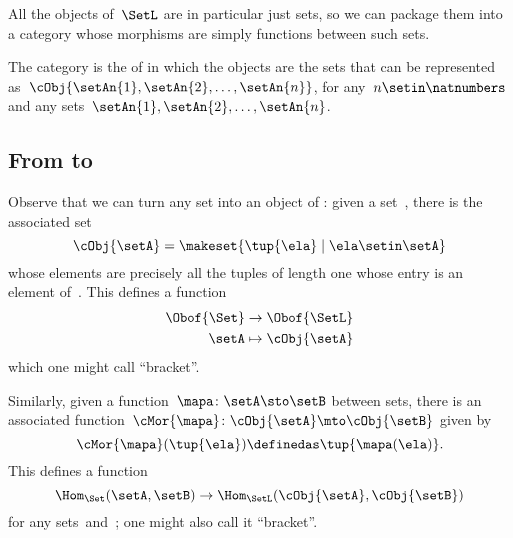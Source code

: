 
All the objects of~$\SetL$ are in particular just sets, so we can package them into a category whose morphisms are simply functions between such sets.

\begin{ctdefinition}[\SetL]\label{def:SetL}
    The category \SetL is the  of \Set in which the objects are the sets that can be represented as~$\cObj{\setAn{1}, \setAn{2}, \ldots, \setAn{n}}$, for any~$n \setin \natnumbers$ and any sets~$\setAn{1}, \setAn{2}, \ldots, \setAn{n}$.
\end{ctdefinition}
\subsection{From \Set to~\SetL}

Observe that we can turn any set into an object of \SetL: given a set~\setA, there is the associated set
\begin{equation}
    \label{eq:setintosetl}
    \cObj{\setA} = \makeset{ \tup{\ela} \mid \ela \setin \setA }
\end{equation}
whose elements are precisely all the tuples of length one whose entry is an element of~\setA.
This defines a function
\begin{equation}
    \label{eq:setintosetlfunction}
    \begin{aligned}
        \Obof{\Set} & \to \Obof{\SetL} \\
        \setA       & \mapsto \cObj{\setA}
    \end{aligned}
\end{equation}
which one might call ``bracket''.

Similarly, given a function~$\mapa \colon \setA \sto \setB$ between sets, there is an associated function~$\cMor{ \mapa }\colon \cObj{\setA} \mto \cObj{\setB}$ given by
\begin{equation}
    \label{eq:functionintosetlmor}
    \cMor{ \mapa } ( \tup{\ela }) \definedas \tup{\mapa(\ela)}.
\end{equation}
This defines a function
\begin{equation}
    \label{eq:functionintosetlmorfun}
    \Hom_{\Set}(\setA,\setB) \to \Hom_{\SetL}(\cObj{\setA},\cObj{\setB})
\end{equation}
for any sets~\setA and~\setB; one might also call it ``bracket''.

